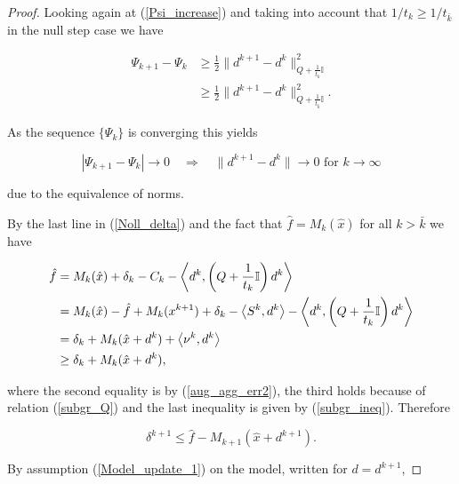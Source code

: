 \begin{proof}
Looking again at (\ref{Psi_increase}) and taking into account that \(1/t_k \geq 1/t_{\bar{k}}\) in the null step case we have

\begin{align*}
	\Psi_{k+1} - \Psi_k & \geq \frac{1}{2}\|d^{k+1}-d^k\|^2_{Q+\frac{1}{t_k}\mathbb{I}} \\
	&\geq \frac{1}{2}\|d^{k+1}-d^k\|^2_{Q+\frac{1}{t_{\bar{k}}}\mathbb{I}}.
\end{align*}

As the sequence \(\{\Psi_k\}\) is converging this yields

\begin{equation}
	|\Psi_{k+1} - \Psi_k | \to 0 \quad \Rightarrow \quad \|d^{k+1}-d^k\| \to 0 \text{ for } k \to \infty
	\label{d_to_0}
\end{equation}

due to the equivalence of norms.


By the last line in (\ref{Noll_delta}) and the fact that \(\hat{f}=M_k(\hat{x})\) for all \(k > \bar{k}\) we have

\begin{align*}
	\hat{f} &= M_k(\hat{x})+\delta_k-C_k-\left\langle d^{k},\left(Q+\frac{1}{t_k}\mathbb{I}\right)d^{k}\right\rangle \\
	&= M_k(\hat{x})-\hat{f} + M_k(x^{k+1})+\delta_k -\left\langle S^k,d^k \right\rangle-\left\langle d^{k},\left(Q+\frac{1}{t_k}\mathbb{I}\right)d^{k}\right\rangle \\
	&= \delta_k + M_k(\hat{x}+d^k)+\left\langle \nu^k, d^k \right\rangle\\
	&\geq \delta_k+M_k(\hat{x}+d^k),
\end{align*}

where the second equality is by (\ref{aug_agg_err2}), the third holds because of relation (\ref{subgr_Q}) and the last inequality is given by (\ref{subgr_ineq}). Therefore 

\begin{equation}
	\delta^{k+1} \leq \hat{f}-M_{k+1}(\hat{x}+d^{k+1}).
	\label{dfM}
\end{equation}

By assumption (\ref{Model_update_1}) on the model, written for \(d=d^{k+1}\),


\end{proof}
